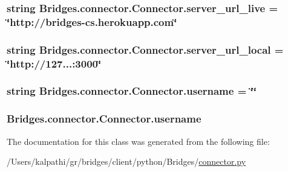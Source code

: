 \subsubsection[{server\+\_\+url\+\_\+live}]{\setlength{\rightskip}{0pt plus 5cm}string Bridges.\+connector.\+Connector.\+server\+\_\+url\+\_\+live = \char`\"{}http\+://bridges-\/cs.\+herokuapp.\+com\char`\"{}\hspace{0.3cm}{\ttfamily [static]}}\label{class_bridges_1_1connector_1_1_connector_a09a97560dfa55c54150995cabac1e3d6}
\hypertarget{class_bridges_1_1connector_1_1_connector_a546bccb78927ff9573cee8caa41b210e}{}
\subsubsection[{server\+\_\+url\+\_\+local}]{\setlength{\rightskip}{0pt plus 5cm}string Bridges.\+connector.\+Connector.\+server\+\_\+url\+\_\+local = \char`\"{}http\+://127...\+:3000\char`\"{}\hspace{0.3cm}{\ttfamily [static]}}\label{class_bridges_1_1connector_1_1_connector_a546bccb78927ff9573cee8caa41b210e}
\hypertarget{class_bridges_1_1connector_1_1_connector_aeab093f0dd4b59e46ab280bf7af5ffb8}{}
\subsubsection[{username}]{\setlength{\rightskip}{0pt plus 5cm}string Bridges.\+connector.\+Connector.\+username = \char`\"{}\char`\"{}\hspace{0.3cm}{\ttfamily [static]}}\label{class_bridges_1_1connector_1_1_connector_aeab093f0dd4b59e46ab280bf7af5ffb8}
\hypertarget{class_bridges_1_1connector_1_1_connector_ab87dbc1ca549f3c2b4ac5a19abcc20e0}{}
\subsubsection[{username}]{\setlength{\rightskip}{0pt plus 5cm}Bridges.\+connector.\+Connector.\+username}\label{class_bridges_1_1connector_1_1_connector_ab87dbc1ca549f3c2b4ac5a19abcc20e0}


The documentation for this class was generated from the following file\+:\begin{DoxyCompactItemize}
\item 
/\+Users/kalpathi/gr/bridges/client/python/\+Bridges/\hyperlink{connector_8py}{connector.\+py}\end{DoxyCompactItemize}
